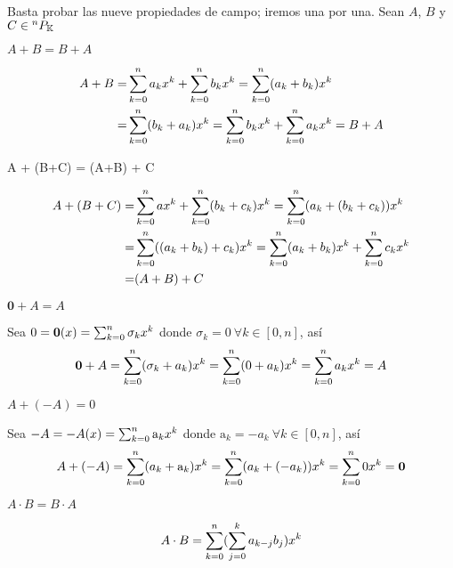 \documentclass[letterpaper,12pt]{book}
\newenvironment{proof}[1][Dem]{\begin{trivlist} %
\item[\hskip \labelsep {\bfseries #1}]}{\end{trivlist}}
\begin{document}
\begin{proof}
Basta probar las nueve propiedades de campo; iremos una por una.
Sean $A$, $B$ y $C \in {^{n}P_{\mathbb{K}}}$
\begin{enumerate}

 \item $ A + B = B + A $
 \begin{proof}
  \begin{align*}
   A + B =& \sum_{k=0}^n a_k x^k + \sum_{k=0}^n b_k x^k  = \sum_{k=0}^n (a_k + b_k) x^k \\ 
   =& \sum_{k=0}^n (b_k + a_k) x^k = \sum_{k=0}^n b_k x^k +     \sum_{k=0}^n a_k x^k = B + A
  \end{align*}
 \end{proof}
 
 \item A + (B+C) = (A+B) + C
 \begin{proof}
  \begin{align*}
   A + (B+C) =& \sum_{k=0}^n a x^k + \sum_{k=0}^n (b_k+c_k) x^k = \sum_{k=0}^n (a_k + (b_k + c_k)) x^k \\
   =&  \sum_{k=0}^n ((a_k + b_k) + c_k) x^k = \sum_{k=0}^n (a_k+b_k) x^k + \sum_{k=0}^n c_k x^k \\
   =& (A+B) + C 
  \end{align*}
 \end{proof}
 
 \item $ \mathbf{0} + A = A $
 \begin{proof}
 Sea $0 = \mathbf{0}(x) = \sum_{k=0}^n \sigma_k x^k$ donde $\sigma_k = 0 \ \forall k \in [0,n]$, así 
  \begin{align*}
  \mathbf{0} + A = \sum_{k=0}^n (\sigma_k + a_k) x^k = \sum_{k=0}^n (0 + a_k) x^k = \sum_{k=0}^n a_k x^k = A
  \end{align*}
 \end{proof}
 
 \item $ A + (-A) = 0 $
 \begin{proof}
 Sea $-A = -A(x) = \sum_{k=0}^n \mathrm{a}_k x^k$ donde $\mathrm{a}_k = -a_k \ \forall k \in [0,n]$, así
  \begin{align*}
   A + (-A) = \sum_{k=0}^n (a_k + \mathrm{a}_k) x^k = \sum_{k=0}^n (a_k + (-a_k)) x^k = \sum_{k=0}^n 0 x^k = \mathbf{0}
  \end{align*}
 \end{proof}
 
 \item $ A\cdot B = B\cdot A $
 \begin{proof}
  \begin{align*} 
   A\cdot B = \sum_{k=0}^n  (\sum_{j=0}^k a_{k-j}b_j )  x^k
  \end{align*}
 \end{proof}
 

\end{enumerate}
\end{proof}
\end{document}

